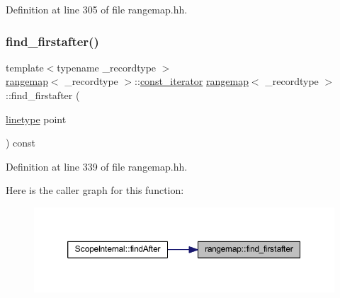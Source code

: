 Definition at line 305 of file rangemap.\+hh.

\mbox{\label{classrangemap_a280a3884907728c081165897fe8469de}} 
\subsubsection{\texorpdfstring{find\_firstafter()}{find\_firstafter()}}
{\footnotesize\ttfamily template$<$typename \+\_\+recordtype $>$ \\
\mbox{\hyperlink{classrangemap}{rangemap}}$<$ \+\_\+recordtype $>$\+::\mbox{\hyperlink{classrangemap_affa7462e68d053d3a066fe0b8d46a99d}{const\+\_\+iterator}} \mbox{\hyperlink{classrangemap}{rangemap}}$<$ \+\_\+recordtype $>$\+::find\+\_\+firstafter (\begin{DoxyParamCaption}\item[{\mbox{\hyperlink{classrangemap_a54c8f7622f9af4c4232d764cf9ed11fa}{linetype}}}]{point }\end{DoxyParamCaption}) const}



Definition at line 339 of file rangemap.\+hh.

Here is the caller graph for this function\+:
\nopagebreak
\begin{figure}[H]
\begin{center}
\leavevmode
\includegraphics[width=350pt]{classrangemap_a280a3884907728c081165897fe8469de_icgraph}
\end{center}
\end{figure}
\mbox{\label{classrangemap_a0acf9c66dfc36b41d1a1062fa6692ff7}} 
